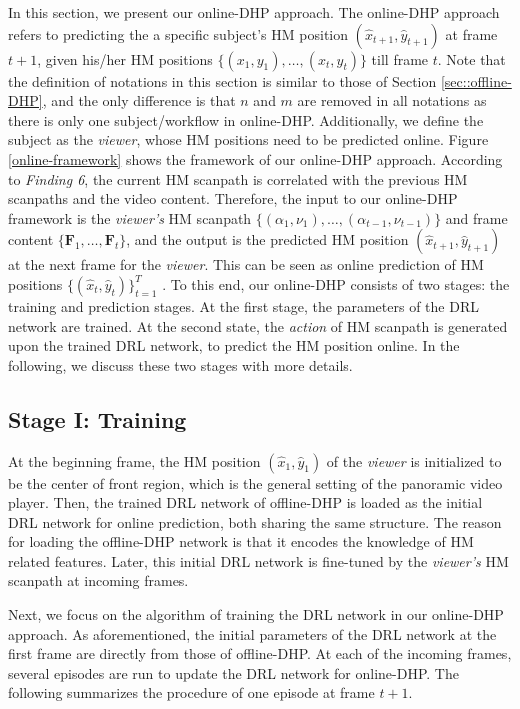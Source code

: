 \documentclass[10pt,journal,compsoc]{IEEEtran}
\begin{document}
In this section, we present our online-DHP approach.
The online-DHP approach refers to predicting the a specific subject's HM position $(\hat{x}_{t+1},\hat{y}_{t+1})$ at frame $t+1$, given his/her HM positions $\{(x_{1},y_{1}),\ldots, (x_{t},y_{t})\}$ till frame $t$.
Note that the definition of notations in this section is similar to those of Section \ref{sec::offline-DHP}, and the only difference is that $n$ and $m$ are removed in all notations as there is only one subject/workflow in online-DHP.
Additionally, we define the subject as the \textit{viewer}, whose HM positions need to be predicted online. %
Figure \ref{online-framework} shows the framework of our online-DHP approach. %
According to \textit{Finding 6}, the current HM scanpath is correlated with the previous HM scanpaths and the video content.
Therefore, the input to our online-DHP framework is the \textit{viewer's} HM scanpath $\{(\alpha_1,\nu_1),\ldots, (\alpha_{t-1},\nu_{t-1})\}$ and frame content $\{\mathbf{F}_1, \ldots, \mathbf{F}_t \}$, and the output is the predicted HM position $(\hat{x}_{t+1},\hat{y}_{t+1})$ at the next frame for the \textit{viewer}.
This can be seen as online prediction of HM positions $\{(\hat{x}_{t},\hat{y}_{t})\}_{t=1}^{T}$ .
To this end, our online-DHP consists of two stages: the training and prediction stages.
At the first stage, the parameters of the DRL network are trained.
At the second state, the \textit{action} of HM scanpath is generated upon the trained DRL network, to predict the HM position online.
In the following, we discuss these two stages with more details.

\subsection{Stage I: Training}
At the beginning frame, the HM position $(\hat{x}_1,\hat{y}_1)$ of the \textit{viewer} is initialized to be the center of front region, which is the general setting of  the panoramic video player. Then, the trained DRL network of offline-DHP is loaded as the initial DRL network for online prediction, both sharing the same structure.
The reason for loading the offline-DHP network is that it encodes the knowledge of HM related features.
Later, this initial DRL network is fine-tuned by the \textit{viewer's} HM scanpath at incoming frames.

Next, we focus on the algorithm of training the DRL network in our online-DHP approach. As aforementioned, the initial parameters of the DRL network at the first frame are directly from those of offline-DHP. At each of the incoming frames, several episodes are run to update the DRL network for online-DHP. The following summarizes the procedure of one episode at frame $t+1$.
\end{document}
